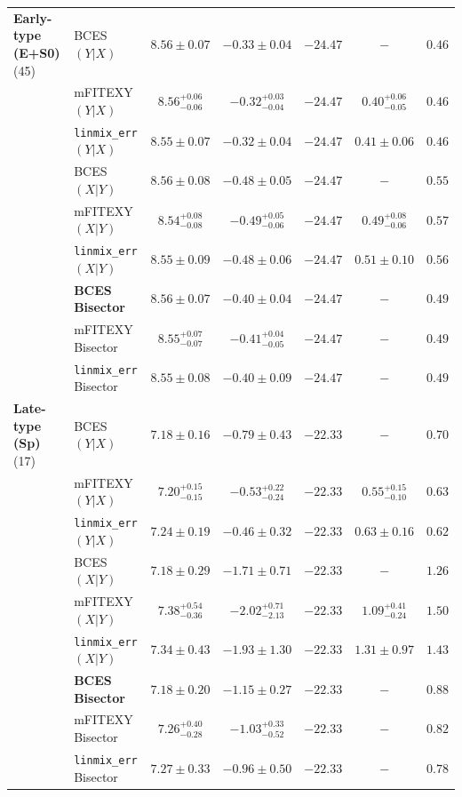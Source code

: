 \documentclass[preprint2]{emulateapj}
\begin{document}
\begin{table}
\begin{tabular}{llccccc}
{\bf Early-type (E+S0)} (45) & BCES $(Y|X)$    & $8.56 \pm 0.07$ & $-0.33 \pm 0.04$ & $-24.47$ & $-$    & $0.46$ \\
                             & mFITEXY $(Y|X)$ & $8.56^{+0.06}_{-0.06}$ & $-0.32^{+0.03}_{-0.04}$ & $-24.47$ & $0.40^{+0.06}_{-0.05}$ & $0.46$ \\
                             & {\tt linmix\_err} $(Y|X)$  & $8.55 \pm 0.07$ & $-0.32 \pm 0.04$ & $-24.47$ & $0.41 \pm 0.06$ & $0.46$ \\ [0.5em]
                             & BCES $(X|Y)$    & $8.56 \pm 0.08$ & $-0.48 \pm 0.05$ & $-24.47$ & $-$    & $0.55$ \\
                             & mFITEXY $(X|Y)$ & $8.54^{+0.08}_{-0.08}$ & $-0.49^{+0.05}_{-0.06}$ & $-24.47$ & $0.49^{+0.08}_{-0.06}$ & $0.57$\\
                             & {\tt linmix\_err} $(X|Y)$  & $8.55 \pm 0.09$ & $-0.48 \pm 0.06$ & $-24.47$ & $0.51 \pm 0.10$ & $0.56$ \\ [0.5em]
                             & {\bf BCES Bisector}& $\boldsymbol{8.56 \pm 0.07}$ & $\boldsymbol{-0.40 \pm 0.04}$ & $\boldsymbol{-24.47}$ & $-$    & $\boldsymbol{0.49}$ \\
                             & mFITEXY Bisector   & $8.55^{+0.07}_{-0.07}$ & $-0.41^{+0.04}_{-0.05}$ & $-24.47$ & $-$    & $0.49$ \\
                             & {\tt linmix\_err} Bisector    & $8.55 \pm 0.08$ & $-0.40 \pm 0.09$ & $-24.47$ & $-$    & $0.49$ \\ [0.5em]

{\bf Late-type (Sp)} (17) & BCES $(Y|X)$    & $7.18 \pm 0.16$ & $-0.79 \pm 0.43$ & $-22.33$ & $-$    & $0.70$ \\
                          & mFITEXY $(Y|X)$    & $7.20^{+0.15}_{-0.15}$ & $-0.53^{+0.22}_{-0.24}$ & $-22.33$ & $0.55^{+0.15}_{-0.10}$ & $0.63$ \\
                          & {\tt linmix\_err} $(Y|X)$  & $7.24 \pm 0.19$ & $-0.46 \pm 0.32$ & $-22.33$ & $0.63 \pm 0.16$ & $0.62$ \\ [0.5em]
                          & BCES $(X|Y)$    & $7.18 \pm 0.29$ & $-1.71 \pm 0.71$ & $-22.33$ & $-$    & $1.26$ \\
                          & mFITEXY $(X|Y)$    & $7.38^{+0.54}_{-0.36}$ & $-2.02^{+0.71}_{-2.13}$ & $-22.33$ & $1.09^{+0.41}_{-0.24}$ & $1.50$ \\
                          & {\tt linmix\_err} $(X|Y)$  & $7.34 \pm 0.43$ & $-1.93 \pm 1.30$ & $-22.33$ & $1.31 \pm 0.97$ & $1.43$ \\ [0.5em]
                          & {\bf BCES Bisector}& $\boldsymbol{7.18 \pm 0.20}$ & $\boldsymbol{-1.15 \pm 0.27}$ & $\boldsymbol{-22.33}$ & $-$    & $\boldsymbol{0.88}$ \\
                          & mFITEXY Bisector   & $7.26^{+0.40}_{-0.28}$ & $-1.03^{+0.33}_{-0.52}$ & $-22.33$ & $-$    & $0.82$ \\
                          & {\tt linmix\_err} Bisector & $7.27 \pm 0.33$ & $-0.96 \pm 0.50$ & $-22.33$ & $-$    & $0.78$ \\ [0.5em]


\end{tabular}
\end{table}
\end{document}
